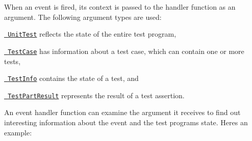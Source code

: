 When an event is fired, its context is passed to the handler function as an argument. The following argument types are used\+:
\begin{DoxyItemize}
\item \href{../include/gtest/gtest.h#L1151}\texttt{ Unit\+Test} reflects the state of the entire test program,
\item \href{../include/gtest/gtest.h#L778}\texttt{ Test\+Case} has information about a test case, which can contain one or more tests,
\item \href{../include/gtest/gtest.h#L644}\texttt{ Test\+Info} contains the state of a test, and
\item \href{../include/gtest/gtest-test-part.h#L47}\texttt{ Test\+Part\+Result} represents the result of a test assertion.
\end{DoxyItemize}

An event handler function can examine the argument it receives to find out interesting information about the event and the test program\textquotesingle{}s state. Here\textquotesingle{}s an example\+:


\begin{DoxyCode}{0}
\DoxyCodeLine{  \}}
\DoxyCodeLine{}
\DoxyCodeLine{  \}}
\DoxyCodeLine{}
\DoxyCodeLine{  \}}
\DoxyCodeLine{\};}
\end{DoxyCode}


